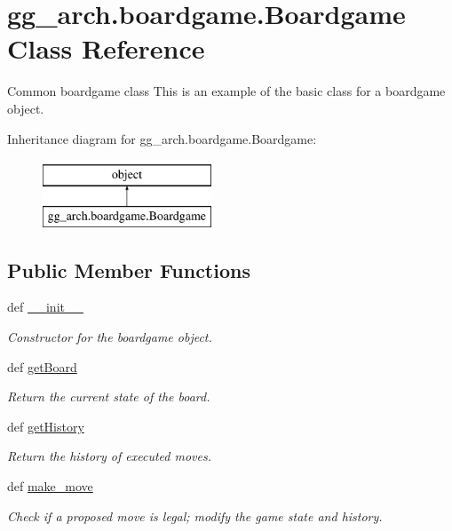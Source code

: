 \hypertarget{classgg__arch_1_1boardgame_1_1_boardgame}{\section{gg\-\_\-arch.\-boardgame.\-Boardgame Class Reference}
\label{classgg__arch_1_1boardgame_1_1_boardgame}
}


Common boardgame class This is an example of the basic class for a boardgame object.  


Inheritance diagram for gg\-\_\-arch.\-boardgame.\-Boardgame\-:\begin{figure}[H]
\begin{center}
\leavevmode
\includegraphics[height=2.000000cm]{classgg__arch_1_1boardgame_1_1_boardgame}
\end{center}
\end{figure}
\subsection*{Public Member Functions}
\begin{DoxyCompactItemize}
\item 
def \hyperlink{classgg__arch_1_1boardgame_1_1_boardgame_a9fabc6d25f2732b81c46c20fcc84890a}{\-\_\-\-\_\-init\-\_\-\-\_\-}
\begin{DoxyCompactList}\small\item\em Constructor for the boardgame object. \end{DoxyCompactList}\item 
def \hyperlink{classgg__arch_1_1boardgame_1_1_boardgame_a241fc5e6df46e0a3b91214730e5ca7ca}{get\-Board}
\begin{DoxyCompactList}\small\item\em Return the current state of the board. \end{DoxyCompactList}\item 
def \hyperlink{classgg__arch_1_1boardgame_1_1_boardgame_ad09b9d93abd9c2ddbfb8f30cd3ba024f}{get\-History}
\begin{DoxyCompactList}\small\item\em Return the history of executed moves. \end{DoxyCompactList}\item 
def \hyperlink{classgg__arch_1_1boardgame_1_1_boardgame_ac8990eebf22549f1ac0f1130414f4494}{make\-\_\-move}
\begin{DoxyCompactList}\small\item\em Check if a proposed move is legal; modify the game state and history. \end{DoxyCompactList}\end{DoxyCompactItemize}
